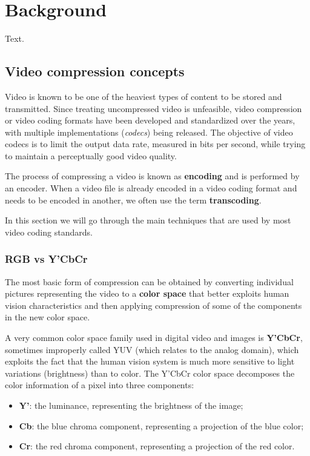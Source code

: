 \chapter{Background}
\label{cha:bg}

Text.


\section{Video compression concepts}
\label{sec:bg/compression}

Video is known to be one of the heaviest types of content to be stored and transmitted. Since treating uncompressed video is unfeasible, video compression or video coding formats have been developed and standardized over the years, with multiple implementations (\textit{codecs}) being released. The objective of video codecs is to limit the output data rate, measured in bits per second, while trying to maintain a perceptually good video quality.

The process of compressing a video is known as \textbf{encoding} and is performed by an encoder. When a video file is already encoded in a video coding format and needs to be encoded in another, we often use the term \textbf{transcoding}.

In this section we will go through the main techniques that are used by most video coding standards.

\subsection{RGB vs Y'CbCr}
\label{sec:bg/compression/ycbcr}

The most basic form of compression can be obtained by converting individual pictures representing the video to a \textbf{color space} that better exploits human vision characteristics and then applying compression of some of the components in the new color space.

A very common color space family used in digital video and images is \textbf{Y'CbCr}, sometimes improperly called YUV (which relates to the analog domain), which exploits the fact that the human vision system is much more sensitive to light variations (brightness) than to color. The Y'CbCr color space decomposes the color information of a pixel into three components:

\begin{itemize}
    \item \textbf{Y'}: the luminance, representing the brightness of the image;
    \item \textbf{Cb}: the blue chroma component, representing a projection of the blue color;
    \item \textbf{Cr}: the red chroma component, representing a projection of the red color.
\end{itemize}

